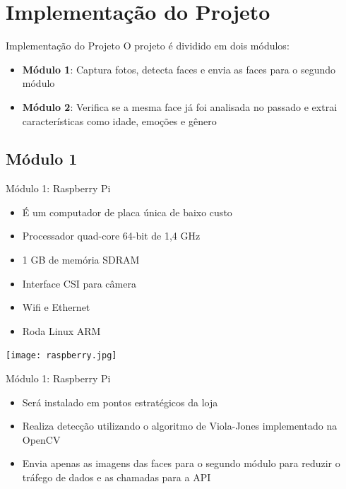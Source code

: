 \section{Implementação do Projeto}


\begin{frame}{Implementação do Projeto}
O projeto é dividido em dois módulos:
\medskip
\begin{itemize}
    \item \textbf{Módulo 1}: Captura fotos, detecta faces e envia as faces para o segundo módulo
    \item \textbf{Módulo 2}: Verifica se a mesma face já foi analisada no passado e extrai características como idade, emoções e gênero
\end{itemize}
\end{frame}


\subsection{Módulo 1}

\begin{frame}{Módulo 1: Raspberry Pi}
\begin{itemize}
    \item É um computador de placa única de baixo custo
    \item Processador quad-core 64-bit de 1,4 GHz
    \item 1 GB de memória SDRAM
    \item Interface CSI para câmera
    \item Wifi e Ethernet
    \item Roda Linux ARM
\end{itemize}
\centerline{\noindent\texttt{[image: raspberry.jpg]}}
\end{frame}


\begin{frame}{Módulo 1: Raspberry Pi}
\begin{itemize}
    \item Será instalado em pontos estratégicos da loja
    \item Realiza detecção utilizando o algoritmo de Viola-Jones implementado na OpenCV
    \item Envia apenas as imagens das faces para o segundo módulo para reduzir o tráfego de dados e as chamadas para a API
\end{itemize}
\end{frame}


